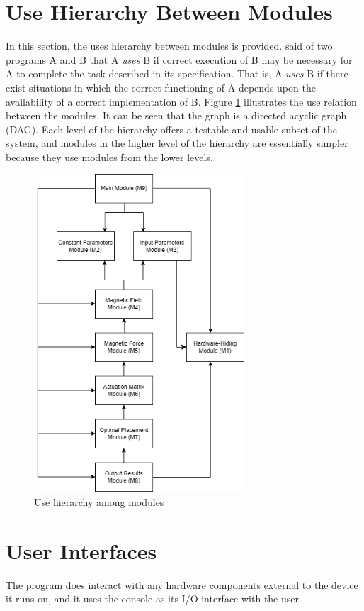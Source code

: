 \documentclass[12pt, titlepage]{article}
\begin{document}
\section{Use Hierarchy Between Modules} \label{SecUse}

In this section, the uses hierarchy between modules is
provided. \citet{Parnas1978} said of two programs A and B that A {\em uses} B if
correct execution of B may be necessary for A to complete the task described in
its specification. That is, A {\em uses} B if there exist situations in which
the correct functioning of A depends upon the availability of a correct
implementation of B.  Figure \ref{FigUH} illustrates the use relation between
the modules. It can be seen that the graph is a directed acyclic graph
(DAG). Each level of the hierarchy offers a testable and usable subset of the
system, and modules in the higher level of the hierarchy are essentially simpler
because they use modules from the lower levels.

\begin{figure}[H]
\centering
\includegraphics[width=0.7\textwidth]{UsesHierarchy.png}
\caption{Use hierarchy among modules}
\label{FigUH}
\end{figure}

\section{User Interfaces}
The program does interact with any hardware components external to the device it runs on, and it uses the console as its I/O interface with the user. 
\end{document}
